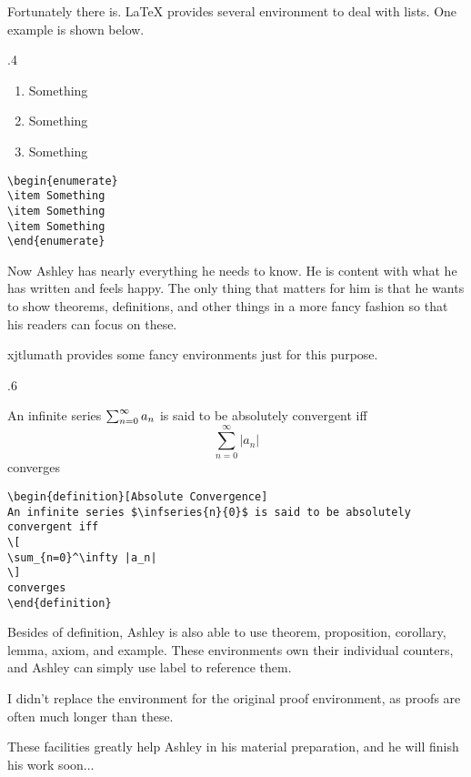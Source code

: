 Fortunately there is. \LaTeX{} provides several environment to deal with lists. One example is shown below.

\begin{miniexammar}{.4\textandmarginlen}{
\begin{enumerate}
\item Something
\item Something
\item Something
\end{enumerate}
}
\begin{lstlisting}
\begin{enumerate}
\item Something
\item Something
\item Something
\end{enumerate}
\end{lstlisting}
\end{miniexammar}

Now Ashley has nearly everything he needs to know. He is content with what he has written and feels happy. The only thing that matters for him is that he wants to show theorems, definitions, and other things in a more fancy fashion so that his readers can focus on these.

xjtlumath provides some fancy environments just for this purpose.

\begin{miniexammar}{.6\textandmarginlen}{
\begin{definition}
An infinite series $\sum_{n=0}^{\infty}{a_{n}}$ is said to be absolutely convergent iff
\[
\sum_{n=0}^\infty |a_n|
\]
converges
\end{definition}
}
\begin{lstlisting}
\begin{definition}[Absolute Convergence]
An infinite series $\infseries{n}{0}$ is said to be absolutely convergent iff
\[
\sum_{n=0}^\infty |a_n|
\]
converges
\end{definition}
\end{lstlisting}
\end{miniexammar}

Besides of definition, Ashley is also able to use theorem, proposition, corollary, lemma, axiom, and example. These environments own their individual counters, and Ashley can simply use label to reference them.

I didn't replace the environment for the original proof environment, as proofs are often much longer than these.

These facilities greatly help Ashley in his material preparation, and he will finish his work soon...